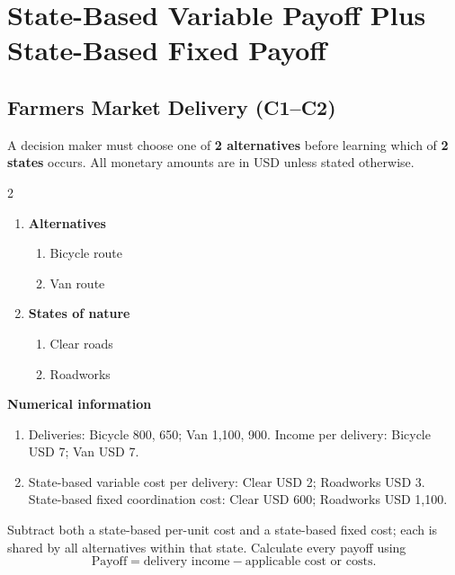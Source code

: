 \section{State-Based Variable Payoff Plus State-Based Fixed Payoff}
\label{sec:state-based-variable-payoff-plus-state-based-fixed-payoff}
\subsection{Farmers Market Delivery (C1--C2)}
\label{sec:problem19-farmers-market-delivery-c1-c2}
A decision maker must choose one of \textbf{2 alternatives} before learning which of \textbf{2 states} occurs. All monetary amounts are in USD unless stated otherwise.
\begin{multicols}{2}
\begin{enumerate}[label=\arabic*.]
 \item \textbf{Alternatives}
 \begin{enumerate}[label=\roman*)]
  \item Bicycle route
  \item Van route
 \end{enumerate}
 \item \textbf{States of nature}
 \begin{enumerate}[label=\roman*)]
  \item Clear roads
  \item Roadworks
 \end{enumerate}
\end{enumerate}
\end{multicols}
 \textbf{Numerical information}
 \begin{enumerate}[label=\roman*)]
  \item Deliveries: Bicycle 800, 650; Van 1,100, 900. Income per delivery: Bicycle USD 7; Van USD 7.
  \item State-based variable cost per delivery: Clear USD 2; Roadworks USD 3. State-based fixed coordination cost: Clear USD 600; Roadworks USD 1,100.
 \end{enumerate}
Subtract both a state-based per-unit cost and a state-based fixed cost; each is shared by all alternatives within that state. Calculate every payoff using
\[
 \text{Payoff}=\text{delivery income}-\text{applicable cost or costs}.
\]

